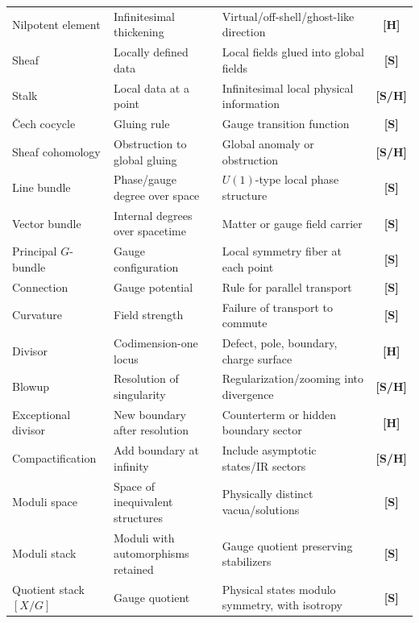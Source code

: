 \documentclass[12pt]{article}
\theoremstyle{definition}
\theoremstyle{remark}
\newcommand{\status}[1]{\textnormal{\textsf{\textbf{[#1]}}}}
\begin{document}
\begin{center}
\begin{longtable}{P{3.6cm} P{4.1cm} P{4.1cm} c}
Nilpotent element & Infinitesimal thickening & Virtual/off-shell/ghost-like direction & \status{H} \\
Sheaf & Locally defined data & Local fields glued into global fields & \status{S} \\
Stalk & Local data at a point & Infinitesimal local physical information & \status{S/H} \\
\v{C}ech cocycle & Gluing rule & Gauge transition function & \status{S} \\
Sheaf cohomology & Obstruction to global gluing & Global anomaly or obstruction & \status{S/H} \\
Line bundle & Phase/gauge degree over space & $U(1)$-type local phase structure & \status{S} \\
Vector bundle & Internal degrees over spacetime & Matter or gauge field carrier & \status{S} \\
Principal $G$-bundle & Gauge configuration & Local symmetry fiber at each point & \status{S} \\
Connection & Gauge potential & Rule for parallel transport & \status{S} \\
Curvature & Field strength & Failure of transport to commute & \status{S} \\
Divisor & Codimension-one locus & Defect, pole, boundary, charge surface & \status{H} \\
Blowup & Resolution of singularity & Regularization/zooming into divergence & \status{S/H} \\
Exceptional divisor & New boundary after resolution & Counterterm or hidden boundary sector & \status{H} \\
Compactification & Add boundary at infinity & Include asymptotic states/IR sectors & \status{S/H} \\
Moduli space & Space of inequivalent structures & Physically distinct vacua/solutions & \status{S} \\
Moduli stack & Moduli with automorphisms retained & Gauge quotient preserving stabilizers & \status{S} \\
Quotient stack $[X/G]$ & Gauge quotient & Physical states modulo symmetry, with isotropy & \status{S} \\
\end{longtable}
\end{center}
\end{document}
